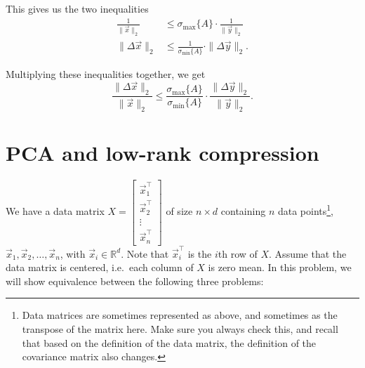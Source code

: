 \documentclass[10pt]{article}
\theoremstyle{definition}
\theoremstyle{plain}
\newcommand{\RR}{\mathbb{R}}
\begin{document}
\begin{enumerate}[label=(\alph*)]
This gives us the two inequalities
\begin{align}
\frac{1}{\|\vec{x}\|_2} &\le \sigma_{\max}\{A\} \cdot \frac{1}{\|\vec{y}\|_2} \\
\|\Delta\vec{x}\|_2 &\le \frac{1}{\sigma_{\min}\{A\}} \cdot \|\Delta\vec{y}\|_2.
\end{align}

Multiplying these inequalities together, we get
\begin{equation}
\frac{\|\Delta\vec{x}\|_2}{\|\vec{x}\|_2} \le \frac{\sigma_{\max}\{A\}}{\sigma_{\min}\{A\}} \cdot \frac{\|\Delta\vec{y}\|_2}{\|\vec{y}\|_2}.
\end{equation}
\end{enumerate}

\newpage

\section{PCA and low-rank compression}

We have a data matrix $X = \begin{bmatrix} \vec{x}_1^\top \\ \vec{x}_2^\top \\ \vdots \\ \vec{x}_n^\top \end{bmatrix}$ of size $n \times d$ containing $n$ data points\footnote{Data matrices are sometimes represented as above, and sometimes as the transpose of the matrix here. Make sure you always check this, and recall that based on the definition of the data matrix, the definition of the covariance matrix also changes.}, $\vec{x}_1, \vec{x}_2, \ldots, \vec{x}_n$, with $\vec{x}_i \in \RR^d$. Note that $\vec{x}_i^\top$ is the $i$th row of $X$. Assume that the data matrix is centered, i.e.\ each column of $X$ is zero mean. In this problem, we will show equivalence between the following three problems:
\end{document}
